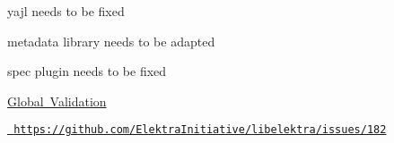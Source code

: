 \begin{DoxyItemize}
\item yajl needs to be fixed
\item metadata library needs to be adapted
\item spec plugin needs to be fixed
\end{DoxyItemize}


\begin{DoxyItemize}
\item \mbox{\hyperlink{doc_decisions_global_validation_md}{Global Validation}}
\end{DoxyItemize}

\href{https://github.com/ElektraInitiative/libelektra/issues/182}{\texttt{ https\+://github.\+com/\+Elektra\+Initiative/libelektra/issues/182}} 